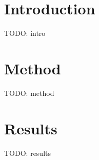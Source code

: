 \section{Introduction}
TODO: intro


\section{Method}

TODO: method

\section{Results}

TODO: results

